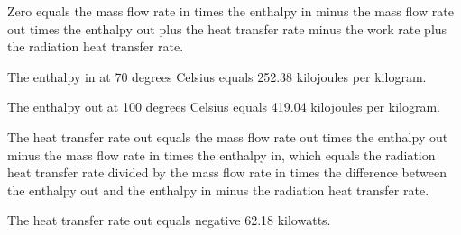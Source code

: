Zero equals the mass flow rate in times the enthalpy in minus the mass flow rate out times the enthalpy out plus the heat transfer rate minus the work rate plus the radiation heat transfer rate.

The enthalpy in at 70 degrees Celsius equals 252.38 kilojoules per kilogram.

The enthalpy out at 100 degrees Celsius equals 419.04 kilojoules per kilogram.

The heat transfer rate out equals the mass flow rate out times the enthalpy out minus the mass flow rate in times the enthalpy in, which equals the radiation heat transfer rate divided by the mass flow rate in times the difference between the enthalpy out and the enthalpy in minus the radiation heat transfer rate.

The heat transfer rate out equals negative 62.18 kilowatts.